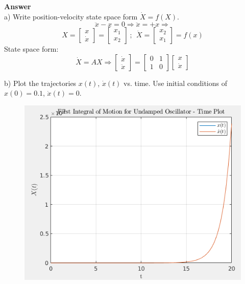 \documentclass{homeworg}
\begin{document}
\noindent
\textbf{Answer} \\
a) Write position-velocity state space form \(\dot{X} = f(X)\).
\begin{equation*}
  \ddot{x} - x = 0 \Rightarrow \ddot{x} = +x \Rightarrow
\end{equation*}
\begin{equation*}
  X =
  \begin{bmatrix}
    x \\
    \dot{x}
  \end{bmatrix}
  = \begin{bmatrix}
    x_1 \\
    x_2
  \end{bmatrix} ~;~~ \dot{X} =
  \begin{bmatrix}
    x_2 \\
    x_1
  \end{bmatrix} = f(x)
\end{equation*}
State space form:
\begin{equation*}
  \dot{X} = AX \Rightarrow
  \begin{bmatrix}
    \dot{x} \\
    \ddot{x}
  \end{bmatrix} =
  \begin{bmatrix}
    0 & 1 \\
    1 & 0
  \end{bmatrix}
  \begin{bmatrix}
    x \\
    \dot{x}
  \end{bmatrix}
\end{equation*}

\newpage
b) Plot the trajectories \(x(t)\), \(\dot{x}(t)\) vs. time. Use initial conditions of \(x(0)=0.1\), \(\dot{x}(t)=0\).
\begin{figure}[h]
  \includegraphics[width=.45\textwidth]{fig05.png}
  \centering
\end{figure}
\end{document}
